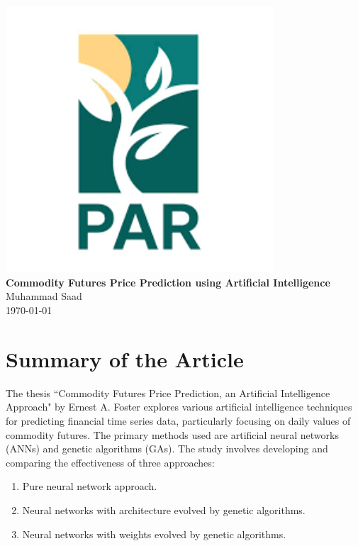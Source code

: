 \documentclass[12pt]{article}
\begin{document}
\begin{titlepage}
    \centering
    \vspace*{\fill} %
    \includegraphics[width=10cm]{img/logo2.png}\\[1cm] %
    {\Large \textbf{Commodity Futures Price Prediction using Artificial Intelligence}}\\[0.5cm]
    {\large Muhammad Saad}\\[0.2cm]
    {\large \today}\\[0.5cm]
    \vspace*{\fill}
\end{titlepage}

\newpage
\tableofcontents
\newpage

\section{Summary of the Article}

The thesis ``Commodity Futures Price Prediction, an Artificial Intelligence Approach" by Ernest A. Foster explores various artificial intelligence techniques for predicting financial time series data, particularly focusing on daily values of commodity futures. The primary methods used are artificial neural networks (ANNs) and genetic algorithms (GAs). The study involves developing and comparing the effectiveness of three approaches:
\begin{enumerate}
    \item Pure neural network approach.
    \item Neural networks with architecture evolved by genetic algorithms.
    \item Neural networks with weights evolved by genetic algorithms.
\end{enumerate}
\end{document}
